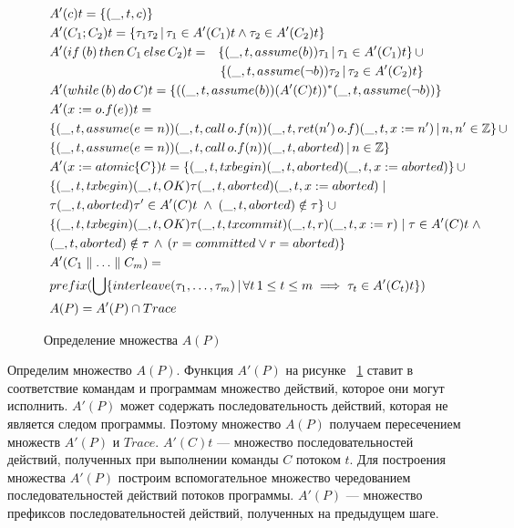 \begin{figure}[t]
\begin{alignat}{2}
&\mathrlap{A'(c)t = \{(\_,t,c)\}} \nonumber \\ 
&\mathrlap{A'(C_1;C_2)t = \{\tau_1\tau_2 \,| \, \tau_1 \in A'(C_1)t \land \tau_2 \in A'(C_2)t \}} \nonumber\\
&A'(if \, (b) \, then \, C_1 \, else \, C_2)t =  &\{(\_,t,assume(b))\tau_1 \, | \, \tau_1 \in A'(C_1)t \} \, \cup \nonumber \\
&& \{ (\_, t, assume(\neg b))\tau_2 \, | \, \tau_2 \in A'(C_2)t\} \nonumber \\
&\mathrlap{A'(while \, (b) \, do \, C)t = \{ ((\_,t,assume(b))(A'(C)t))^*(\_,t,assume(\neg b)) \}} \nonumber\\
&\mathrlap{A'(x := o.f(e))t =} \nonumber \\
&\mathrlap{\{ (\_,t, assume(e =n))(\_, t, call \, o.f(n))(\_,t,ret(n') \, o.f)(\_,t,x:=n') \, | \, n, n' \in \mathbb{Z}\} \, \cup} \nonumber \\
&\mathrlap{\{(\_,t,assume(e=n))(\_,t,call \, o.f(n))(\_,t,aborted) \, | \, n \in \mathbb{Z} \}} \nonumber \\
&\mathrlap{A'(x:=atomic\{C\})t = \{ (\_,t,txbegin)(\_,t,aborted)(\_,t,x:= aborted) \} \, \cup} \nonumber \\
&\mathrlap{\{(\_,t,txbegin)(\_,t,OK)\tau(\_,t,aborted)(\_,t,x:= aborted) \; | }  \nonumber \\
& \mathrlap{\tau(\_,t,aborted)\tau' \in A'(C)t \; \land \; (\_,t,aborted) \notin \tau\} \; \cup} \nonumber \\ 
& \mathrlap{\{(\_,t,txbegin)(\_,t,OK)\tau(\_,t,txcommit)(\_,t,r)(\_,t,x:= r) \; | \; \tau \in A'(C)t  \; \land } \nonumber \\
&\mathrlap{(\_,t,aborted) \notin \tau \, \land \, (r = committed \lor r = aborted) \}} \nonumber \\
& \mathrlap{A'(C_1 \parallel \ldots \parallel C_m) =} \nonumber \\ 
& \mathrlap{prefix(\bigcup \{ interleave(\tau_1,\ldots, \tau_m) \, | \, \forall t \, 1 \leq t \leq m \implies \tau_t \in A'(C_t)t \}) } \nonumber \\
& \mathrlap{A(P) = A'(P) \cap Trace} \nonumber
\end{alignat}
 \caption{Определение множества $A(P)$}
\label{fig:actions}
\end{figure}

Определим множество $A(P)$. Функция $A'(P)$ на рисунке ~\ref{fig:actions} ставит в соответствие командам и программам множество действий, которое они могут исполнить. $A'(P)$ может содержать последовательность действий, которая не является следом программы. Поэтому множество $A(P)$ получаем пересечением множеств $A'(P)$ и $Trace$. $A'(C)t$ --- множество последовательностей действий, полученных при выполнении команды $C$ потоком $t$. Для построения множества $A'(P)$ построим вспомогательное множество чередованием последовательностей действий потоков программы. $A'(P)$ --- множество префиксов последовательностей действий, полученных на предыдущем шаге.

